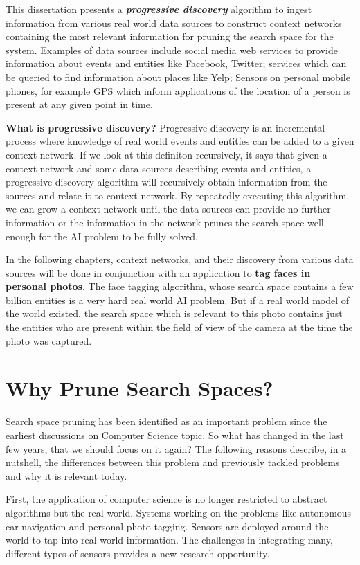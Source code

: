 This dissertation presents a \textbf{\textit{progressive discovery}} algorithm to ingest information from various real world data sources to construct context networks containing the most relevant information for pruning the search space for the system. Examples of data sources include social media web services to provide information about events and entities like Facebook, Twitter; services which can be queried to find information about places like Yelp; Sensors on personal mobile phones, for example GPS which inform applications of the location of a person is present at any given point in time.

\textbf{What is progressive discovery?} Progressive discovery is an incremental process  where knowledge of real world events and entities can be added to a given context network. If we look at this definiton recursively, it says that given a context network and some data sources describing events and entities, a progressive discovery algorithm will recursively obtain information from the sources and relate it to context network. By repeatedly executing this algorithm, we can grow a context network until the data sources can provide no further information or the information in the network prunes the search space well enough for the AI problem to be fully solved.

In the following chapters, context networks, and their discovery from various data sources will be done in conjunction with an application to \textbf{tag faces in personal photos}. The face tagging algorithm, whose search space contains a few billion entities is a very hard real world AI problem. But if a real world model of the world existed, the search space which is relevant to this photo contains just the entities who are present within the field of view of the camera at the time the photo was captured. 

\section{Why Prune Search Spaces?}
Search space pruning has been identified as an important problem since the earliest discussions on Computer Science topic. So what has changed in the last few years, that we should focus on it again? The following reasons describe, in a nutshell, the differences between this problem and previously tackled problems and why it is relevant today.

First, the application of computer science is no longer restricted to abstract algorithms but the real world. Systems working on the problems like autonomous car navigation and personal photo tagging. Sensors are deployed around the world to tap into real world information. The challenges in integrating many, different types of sensors provides a new research opportunity.


